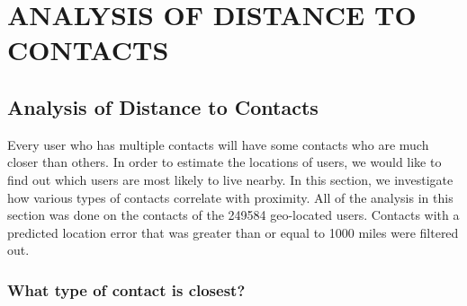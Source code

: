 \ifdefined\THESIS
    \chapter{\uppercase{Analysis of Distance to Contacts}}
\else
    \section{Analysis of Distance to Contacts}
    \label{sec:analysis}
\fi




Every user who has multiple contacts will have some contacts who are much
closer than others.
%
In order to estimate the locations of users, we would like
to find out which users are most likely to live nearby.
%
In this section, we investigate how various types of contacts correlate with
proximity.
%
All of the analysis in this section was done on the contacts of the 249584
geo-located users.
%
Contacts with a predicted location error that was greater than or equal to 1000
miles were filtered out.

\subsection{What type of contact is closest?}
\label{sec:EdgeTypes}

